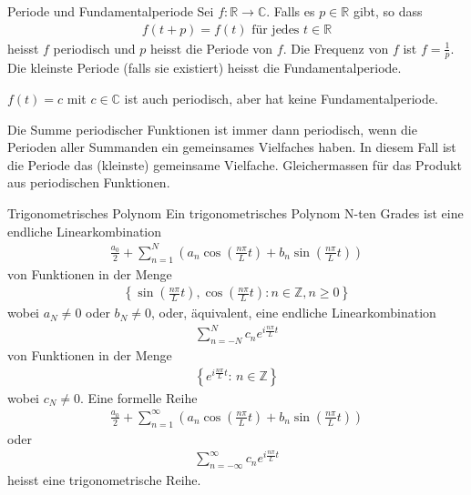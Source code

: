 \documentclass[a4paper,10pt]{article}
\def\C{\mathbb{C}}
\begin{document}
\begin{subbox}{Periode und Fundamentalperiode}
  Sei \(f\colon\mathbb{R}\to\mathbb{C}\). Falls es \(p\in\mathbb{R}\) gibt, so dass \begin{align*}f(t+p)=f(t)\text{ für jedes }t\in\mathbb{R}\end{align*} heisst \(f\) periodisch und \(p\) heisst die Periode von \(f\). Die Frequenz von \(f\) ist $f=\frac{1}{p}$. Die kleinste Periode (falls sie existiert) heisst die Fundamentalperiode.
\end{subbox}

$f(t) = c$ mit $c \in \C$ ist auch periodisch, aber hat keine Fundamentalperiode.

Die Summe periodischer Funktionen ist immer dann periodisch, wenn die Perioden aller Summanden ein gemeinsames Vielfaches haben. In diesem Fall ist die Periode das (kleinste) gemeinsame Vielfache. Gleichermassen für das Produkt aus periodischen Funktionen.

\begin{subbox}{Trigonometrisches Polynom}
  Ein trigonometrisches Polynom N-ten Grades ist eine endliche Linearkombination
   \begin{align*} \frac{a_0}{2}+\sum_{n=1}^N\left(a_n\cos\left(\frac{n\pi}{L}t\right)+b_n\sin\left(\frac{n\pi}{L}t\right)\right) \end{align*}
   von Funktionen in der Menge
    \begin{align*} \left\{\sin\left(\frac{n\pi}{L}t\right),\cos\left(\frac{n\pi}{L}t\right): n\in\mathbb{Z}, n\geq0\right\} \end{align*}
    wobei \(a_N\neq0\) oder \(b_N\neq0\), oder, äquivalent, eine endliche Linearkombination \begin{align*} \sum_{n=-N}^Nc_ne^{ i\frac{n\pi}{L}t} \end{align*}
     von Funktionen in der Menge \begin{align*} \left\{e^{ i\frac{n\pi}{L}t}:\,n\in\mathbb{Z}\right\} \end{align*} wobei \(c_N\neq0\). Eine formelle Reihe \begin{align*} \frac{a_0}{2}+\sum_{n=1}^\infty\left(a_n\cos\left(\frac{n\pi}{L}t\right)+b_n\sin\left(\frac{n\pi}{L}t\right)\right) \end{align*} oder \begin{align*} \sum_{n=-\infty}^\infty c_ne^{ i\frac{n\pi}{L}t} \end{align*} heisst eine trigonometrische Reihe.
 
\end{subbox}
\end{document}
